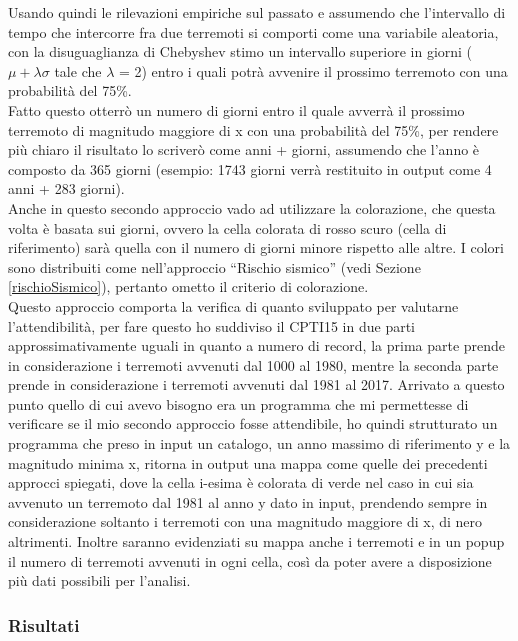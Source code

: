 Usando quindi le rilevazioni empiriche sul passato e assumendo che l'intervallo di tempo che intercorre fra due terremoti si comporti come una variabile aleatoria, con la disuguaglianza di Chebyshev stimo un intervallo superiore in giorni ($\mu + \lambda\sigma$ tale che $\lambda$ = 2) entro i quali potr\`a avvenire il prossimo terremoto con una probabilit\`a del 75\%.\\
Fatto questo otterr\`o un numero di giorni entro il quale avverr\`a il prossimo terremoto di magnitudo maggiore di x con una probabilit\`a del 75\%, per rendere pi\`u chiaro il risultato lo scriver\`o come anni + giorni, assumendo che l'anno \`e composto da 365 giorni (esempio: 1743 giorni verr\`a restituito in output come 4 anni + 283 giorni).\\
Anche in questo secondo approccio vado ad utilizzare la colorazione, che questa volta \`e basata sui giorni, ovvero la cella colorata di rosso scuro (cella di riferimento) sar\`a quella con il numero di giorni minore rispetto alle altre. I colori sono distribuiti come nell'approccio ``Rischio sismico'' (vedi Sezione \ref{rischioSismico}), pertanto ometto il criterio di colorazione.\\
Questo approccio comporta la verifica di quanto sviluppato per valutarne l'attendibilit\`a, per fare questo ho suddiviso il CPTI15 in due parti approssimativamente uguali in quanto a numero di record, la prima parte prende in considerazione i terremoti avvenuti dal 1000 al 1980, mentre la seconda parte prende in considerazione i terremoti avvenuti dal 1981 al 2017. Arrivato a questo punto quello di cui avevo bisogno era un programma che mi permettesse di verificare se il mio secondo approccio fosse attendibile, ho quindi strutturato un programma che preso in input un catalogo, un anno massimo di riferimento y e la magnitudo minima x, ritorna in output una mappa come quelle dei precedenti approcci spiegati, dove la cella i-esima \`e colorata di verde nel caso in cui sia avvenuto un terremoto dal 1981 al anno y dato in input, prendendo sempre in considerazione soltanto i terremoti con una magnitudo maggiore di x, di nero altrimenti. Inoltre saranno evidenziati su mappa anche i terremoti e in un popup il numero di terremoti avvenuti in ogni cella, cos\`i da poter avere a disposizione pi\`u dati possibili per l'analisi.

\subsubsection{Risultati}

